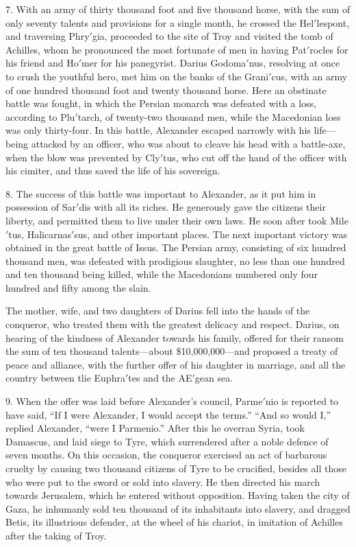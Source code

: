 \documentclass[openany,a4paper]{memoir}
\begin{document}
7. With an army of thirty thousand foot and five thousand 
horse, with the sum of only seventy talents and provisions 
for a single month, he crossed the Hel$'$lespont, and traversing 
Phry$'$gia, proceeded to the site of Troy and visited the tomb 
of Achilles, whom he pronounced the most fortunate of men 
in having Pat$'$rocles for his friend and Ho$'$mer for his panegyrist. Darius Godoma$'$nus, resolving at once to crush the 
youthful hero, met him on the banks of the Grani$'$cus, with 
an army of one hundred thousand foot and twenty thousand 
horse. Here an obstinate battle was fought, in which the 
Persian monarch was defeated with a loss, according to Plu$'$tarch, of twenty-two thousand men, while the Macedonian 
loss was only thirty-four. In this battle, Alexander escaped 
narrowly with his life---being attacked by an officer, who was 
about to cleave his head with a battle-axe, when the blow 
was prevented by Cly$'$tus, who cut off the hand of the officer 
with his cimiter, and thus saved the life of his sovereign. 

8. The success of this battle was important to Alexander, 
as it put him in possession of Sar$'$dis with all its riches. He 
generously gave the citizens their liberty, and permitted them 
to live under their own laws. He soon after took Mile$'$tus, 
Halicarnas$'$sus, and other important places. The next important victory was obtained in the great battle of Issus. 
The Persian army, consisting of six hundred thousand men, 
was defeated with prodigious slaughter, no less than one 
hundred and ten thousand being killed, while the Macedonians numbered only four hundred and fifty among the slain. 

The mother, wife, and two daughters of Darius fell into the 
hands of the conqueror, who treated them with the greatest 
delicacy and respect. Darius, on hearing of the kindness of 
Alexander towards his family, offered for their ransom the 
sum of ten thousand talents---about \$10,000,000---and proposed a treaty of peace and alliance, with the further offer of 
his daughter in marriage, and all the country between tlie 
Euphra$'$tes and the AE$'$gean sea. 

9. When the offer was laid before Alexander's council, Parme$'$nio is reported to have said, ``If I were Alexander, I 
would accept the terms.'' ``And so would I,'' replied Alexander, ``were I Parmenio.'' After this he overran Syria, 
took Damascus, and laid siege to Tyre, which surrendered 
after a noble defence of seven months. On this occasion, the 
conqueror exercised an act of barbarous cruelty by causing 
two thousand citizens of Tyre to be crucified, besides all those 
who were put to the sword or sold into slavery. He then 
directed his march towards Jerusalem, which he entered without opposition. Having taken the city of Gaza, he inhumanly 
sold ten thousand of its inhabitants into slavery, and dragged 
Betis, its illustrious defender, at the wheel of his chariot, in 
imitation of Achilles after the taking of Troy. 
\end{document}
